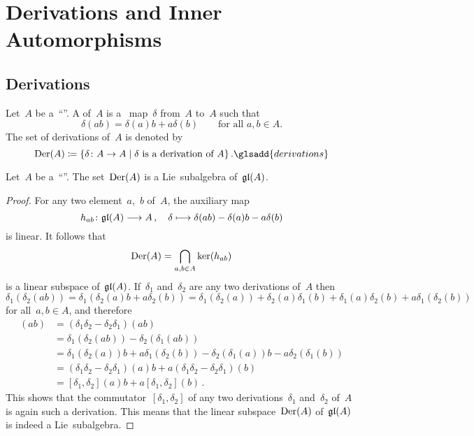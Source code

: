 \section{Derivations and Inner Automorphisms}


\subsection{Derivations}


\begin{definition}
	\label{definition of derivations}
	Let~$A$ be a~\enquote{\algebra{$\kf$}}.
	A  of~$A$ is a~{\linear{$\kf$}} map~$\delta$ from~$A$ to~$A$ such that
	\[
		\delta(ab)
		=
		\delta(a) b + a \delta(b)
		\qquad
		\text{for all~$a, b \in A$.}
	\]
	The set of derivations of~$A$ is denoted by
	\[
		\Der(A)
		\defined
		\{
			\delta
			\colon
			A
			\textstyle\to
			A
		\suchthat
			\text{$\delta$ is a derivation of~$A$}
		\}  \,.
		\glsadd{derivations}
	\]
\end{definition}


\begin{proposition}
	Let~$A$ be a~\enquote{\algebra{$\kf$}}.
	The set~$\operatorname{Der}(A)$ is a Lie~subalgebra of~$\mathfrak{gl}(A)$.
\end{proposition}


\begin{proof}
	For any two element~$a$,~$b$ of~$A$, the auxiliary map
	\[
		h_{ab}
		\colon
		\gllie(A)
		\to
		A \,,
		\quad
		\delta
		\mapsto
		\delta(ab) - \delta(a)b - a \delta(b)
	\]
	is linear.
	It follows that
	\[
		\operatorname{Der}(A)
		=
		\bigcap_{a, b \in A}
		\ker( h_{ab} )
	\]
	is a linear subspace of~$\mathfrak{gl}(A)$.
	If~$\delta_1$ and~$\delta_2$ are any two derivations of~$A$ then
	\[
		\delta_1( \delta_2(ab) )
		=
		\delta_1( \delta_2(a) b + a \delta_2(b) )
		=
		\delta_1(\delta_2(a)) + \delta_2(a) \delta_1(b)
		+ \delta_1(a) \delta_2(b) + a \delta_1( \delta_2(b) )
	\]
	for all~$a, b \in A$, and therefore
	\begin{align*}
		[\delta_1, \delta_2](ab)
		&=
		(\delta_1 \delta_2 - \delta_2 \delta_1)(ab)
		\\
		&=
		\delta_1( \delta_2(ab) ) - \delta_2( \delta_1(ab) )
		\\
		&=
		\delta_1(\delta_2(a)) b + a \delta_1(\delta_2(b))
		- \delta_2(\delta_1(a)) b - a \delta_2(\delta_1(b))
		\\
		&=
		(\delta_1 \delta_2 - \delta_2 \delta_1)(a) b
		+ a (\delta_1 \delta_2 - \delta_2 \delta_1)(b)
		\\
		&=
		[\delta_1, \delta_2](a) b + a [\delta_1, \delta_2](b) \,.
	\end{align*}
	This shows that the commutator~$[\delta_1, \delta_2]$ of any two derivations~$\delta_1$ and~$\delta_2$ of~$A$ is again such a derivation.
	This means that the linear subspace~$\operatorname{Der}(A)$ of~$\mathfrak{gl}(A)$ is indeed a Lie~subalgebra.
\end{proof}


